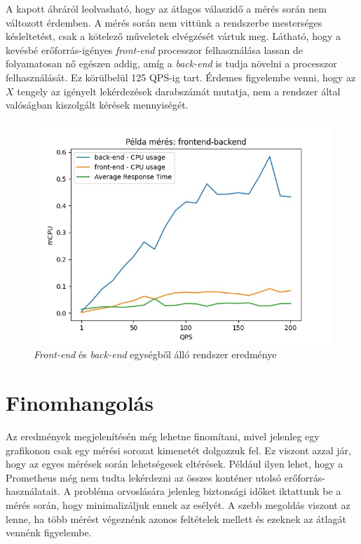 A kapott ábráról leolvasható, hogy az átlagos válaszidő a mérés során nem változott érdemben. A mérés során nem vittünk a rendszerbe mesterséges késleltetést, csak a kötelező műveletek elvégzését vártuk meg. Látható, hogy a kevésbé erőforrás-igényes \textit{front-end} processzor felhasználása lassan de folyamatosan nő egészen addig, amíg a \textit{back-end} is tudja növelni a processzor felhasználását. Ez körülbelül 125 QPS-ig tart. Érdemes figyelembe venni, hogy az $X$ tengely az igényelt lekérdezések darabszámát mutatja, nem a rendszer által valóságban kiszolgált kérések mennyiségét. \\


\begin{figure}[!ht]
\centering
\includegraphics[width=150mm, keepaspectratio]{figures/example_plot.jpg}
\caption{\textit{Front-end} és \textit{back-end} egységből álló rendszer eredménye}
\label{fig:example_plot}
\end{figure}


\section{Finomhangolás}
Az eredmények megjelenítésén még lehetne finomítani, mivel jelenleg egy grafikonon csak egy mérési sorozat kimenetét dolgozzuk fel. Ez viszont azzal jár, hogy az egyes mérések során lehetségesek eltérések. Például ilyen lehet, hogy a Prometheus még nem tudta lekérdezni az összes konténer utolsó erőforrás-használatait. A probléma orvoslására jelenleg biztonsági időket iktattunk be a mérés során, hogy minimalizáljuk ennek az esélyét. A szebb megoldás viszont az lenne, ha több mérést végeznénk azonos feltételek mellett és ezeknek az átlagát vennénk figyelembe.

